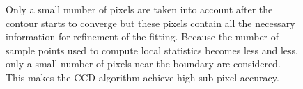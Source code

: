 \begin{figure}[htbp]
  \begin{minipage}[t]{0.5\linewidth} 
    \centering 
  \end{minipage} 
\caption[Pixels used in each iteration]{Only a small number of pixels are taken into account after the
contour starts to converge but these pixels contain all the
necessary information for refinement of the fitting. Because the
number of sample points used to compute local statistics 
becomes less and less, only a small number of pixels near the boundary
are considered. This makes the CCD algorithm achieve high
sub-pixel accuracy.}
\label{fig:pon}
\end{figure}


